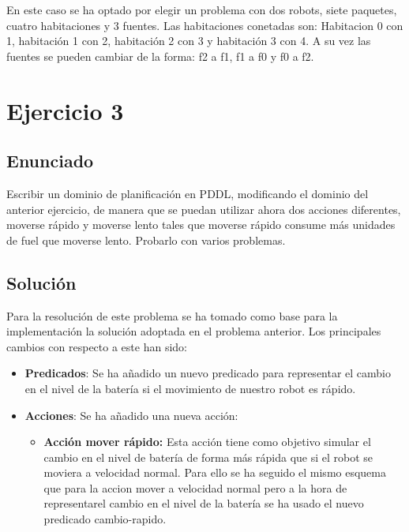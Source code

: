 En este caso se ha optado por elegir un problema con dos robots, siete paquetes, cuatro habitaciones y 3 fuentes. Las habitaciones conetadas son: Habitacion 0 con 1, habitación 1 con 2, habitación 2 con 3 y habitación 3 con 4. A su vez las fuentes se pueden cambiar de la forma: f2 a f1, f1 a f0 y f0 a f2.
\newpage

\section{Ejercicio 3}

\subsection{Enunciado}

Escribir  un  dominio  de  planificación  en  PDDL,  modificando  el  dominio  del  anterior ejercicio,  de  manera  que  se  puedan  utilizar  ahora  dos acciones  diferentes,  moverse rápido y moverse lento tales que moverse rápido consume más unidades de fuel que moverse lento. Probarlo con varios problemas.

\subsection{Solución}


Para la resolución de este problema se ha tomado como base para la implementación la solución adoptada en el problema anterior. Los principales cambios con respecto a este han sido:
\begin{itemize}

	\item \textbf{Predicados}: Se ha añadido un nuevo predicado para representar el cambio en el nivel de la batería si el movimiento de nuestro robot es rápido.
	
	\item \textbf{Acciones}: Se ha añadido una nueva acción:

	\begin{itemize}
	
		\item \textbf{Acción mover rápido:} Esta acción tiene como objetivo simular el cambio en el nivel de batería de forma más rápida que si el robot se moviera a velocidad normal. Para ello se ha seguido el mismo esquema que para la accion mover a velocidad normal pero a la hora de representarel cambio en el nivel de la batería se ha usado el nuevo predicado cambio-rapido.
		
	
	\end{itemize}	

	
\end{itemize}


